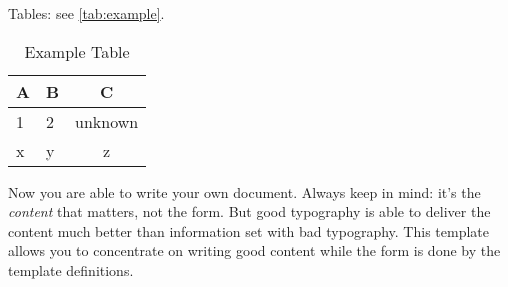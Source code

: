 Tables: see \autoref{tab:example}.

\begin{table}
	\centering
	\begin{tabular}{llc}
	\toprule
	A & B & C\\
	\midrule
	1 & 2 & unknown\\
	x & y & z\\
	\bottomrule
	\end{tabular}
	\caption{Example Table}
	\label{tab:example}
\end{table}

Now you are able to write your own document. Always keep in mind: it's
the \emph{content} that matters, not the form. But good typography is
able to deliver the content much better than information set with bad
typography. This template allows you to concentrate on writing good
content while the form is done by the template definitions.